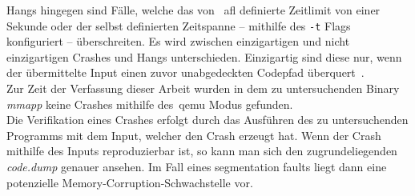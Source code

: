 Hangs hingegen sind Fälle, welche das von ~\gls{afl} definierte Zeitlimit von einer Sekunde oder der selbst definierten
Zeitspanne -- mithilfe des \texttt{-t} Flags konfiguriert -- überschreiten.
Es wird zwischen einzigartigen und nicht einzigartigen Crashes und Hangs unterschieden.
Einzigartig sind diese nur, wenn der übermittelte Input einen zuvor unabgedeckten Codepfad überquert~\cite{inetpreting-output}. \\
Zur Zeit der Verfassung dieser Arbeit wurden in dem zu untersuchenden Binary \textit{mmapp} keine Crashes
mithilfe des~\gls{qemu} Modus gefunden. \\
\linebreak
Die Verifikation eines Crashes erfolgt durch das Ausführen des zu untersuchenden Programms mit dem Input, welcher
den Crash erzeugt hat.
Wenn der Crash mithilfe des Inputs reproduzierbar ist, so kann man sich den zugrundeliegenden \textit{code.dump} genauer
ansehen.
Im Fall eines segmentation faults liegt dann eine potenzielle Memory-Corruption-Schwachstelle vor.